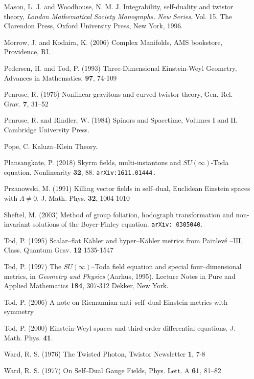 \begin{thebibliography}{}
 Mason, L. J. and Woodhouse, N. M. J.  Integrability, self-duality and twistor theory, {\em London Mathematical Society Monographs. New Series}, Vol. 15, The Clarendon Press, Oxford University Press, New York, 1996.

 Morrow, J. and Kodaira, K. (2006)
Complex Manifolds, AMS bookstore, Providence, RI.

 Pedersen, H. and Tod, P. (1993)
Three-Dimensional Einstein-Weyl Geometry,
Advances in Mathematics, {\bf 97}, 74-109


 Penrose, R. (1976) Nonlinear 
gravitons and curved twistor theory, Gen. Rel. Grav.  {\bf 7},  31--52

 Penrose, R. and Rindler, W. (1984)
Spinors and Spacetime, Volumes I and II. Cambridge University Press.

 Pope, C. Kaluza--Klein Theory.

 Plansangkate, P. (2018)
Skyrm fields, multi-instantons and $SU(\infty)$-Toda equation.
Nonlinearity {\bf 32}, 88.
{\tt arXiv:1611.01444.}

 Przanowski, M. (1991)
Killing vector fields in self--dual, Euclidean Einstein spaces with $\Lambda\neq 0$,
J. Math. Phys. {\bf 32}, 1004-1010

 Sheftel, M. (2003)
Method of group foliation, hodograph transformation and non-invariant solutions of the Boyer-Finley equation.
{\tt arXiv: 0305040}.

 Tod, P. (1995)
Scalar--flat K\"ahler and hyper--K\"ahler metrics from Painlev\'e --III,
Class. Quantum Grav. {\bf 12} 1535-1547

 Tod, P. (1997)
The $SU(\infty)$--Toda field equation and special four--dimensional metrics,
in {\em Geometry and Physics} (Aarhus, 1995), Lecture Notes in Pure and Applied Mathematics {\bf 184}, 307-312 Dekker, New York.

 Tod, P. (2006) {A note on Riemannian anti--self--dual Einstein metrics with symmetry}

 Tod, P. (2000) {Einstein-Weyl spaces and third-order differential equations}, J. Math. Phys. {\bf 41}.



 Ward, R. S. (1976)
The Twisted Photon,
Twistor Newsletter {\bf 1}, 7-8

 Ward, R. S. (1977)
On Self--Dual Gauge Fields,
Phys. Lett. A {\bf 61}, 81--82


\end{thebibliography}
